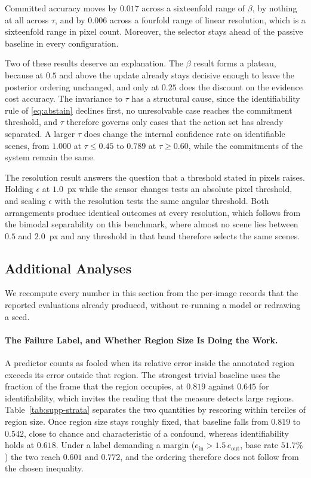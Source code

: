 \documentclass{article} %
\theoremstyle{defstyle}
\theoremstyle{plain}
\begin{document}
Committed accuracy moves by $0.017$ across a sixteenfold range of $\beta$, by nothing
at all across $\tau$, and by $0.006$ across a fourfold range of linear resolution,
which is a sixteenfold range in pixel count. Moreover, the selector stays ahead of the passive baseline in every configuration.

Two of these results deserve an explanation. The $\beta$ result forms a plateau, because at
$0.5$ and above the update already stays decisive enough to leave the posterior ordering
unchanged, and only at $0.25$ does the discount on the evidence cost accuracy. The invariance
to $\tau$ has a structural cause, since the identifiability rule of \eqref{eq:abstain}
declines first, no unresolvable case reaches the commitment threshold, and $\tau$ therefore
governs only cases that the action set has already separated. A larger $\tau$ does change the internal
confidence rate on identifiable scenes, from $1.000$ at $\tau \leq 0.45$ to $0.789$ at
$\tau \geq 0.60$, while the commitments of the system remain the same.

The resolution result answers the question that a threshold stated in pixels raises. Holding
$\epsilon$ at $1.0$~px while the sensor changes tests an absolute pixel threshold, and scaling
$\epsilon$ with the resolution tests the same angular threshold. Both arrangements produce
identical outcomes at every resolution, which follows from the bimodal separability on this
benchmark, where almost no scene lies between $0.5$ and $2.0$~px and any threshold in that
band therefore selects the same scenes.

\subsection{Additional Analyses}
\label{sec:supp-additional}

We recompute every number in this section from the per-image records that the reported
evaluations already produced, without re-running a model or redrawing a seed.

\paragraph{The Failure Label, and Whether Region Size Is Doing the Work.}
A predictor counts as fooled when its relative error inside the annotated region exceeds
its error outside that region. The strongest trivial baseline uses the fraction of the frame
that the region occupies, at $0.819$ against $0.645$ for identifiability, which invites the
reading that the measure detects large regions. Table~\ref{tab:supp-strata} separates the two
quantities by rescoring within terciles of region size. Once region size stays roughly fixed,
that baseline falls from $0.819$ to $0.542$, close to chance and characteristic of a
confound, whereas identifiability holds at $0.618$. Under a label demanding a margin
($e_{\text{in}} > 1.5\,e_{\text{out}}$, base rate $51.7\%$) the two reach $0.601$ and
$0.772$, and the ordering therefore does not follow from the chosen inequality.
\end{document}
